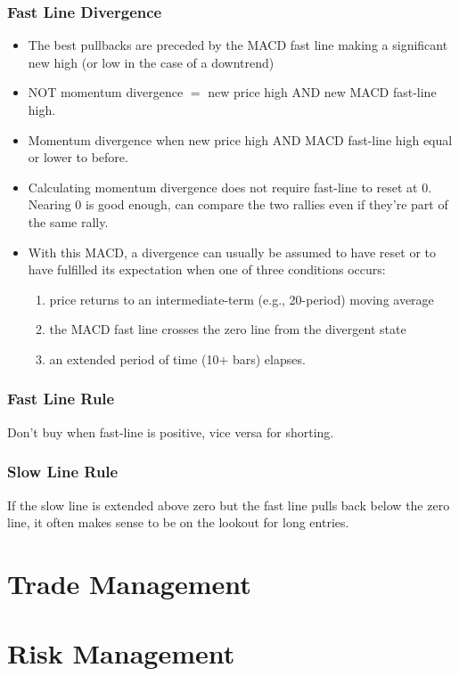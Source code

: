 \documentclass{../notes}
\begin{document}
\subsubsection{Fast Line Divergence}
\begin{itemize}
  \item The best pullbacks are preceded by the MACD fast line making a significant new high (or low in the case of a downtrend)
  \item NOT momentum divergence $=$ new price high AND new MACD fast-line high.
  \item Momentum divergence when new price high AND MACD fast-line high equal or lower to before.
  \item Calculating momentum divergence does not require fast-line to reset at 0. Nearing 0 is good enough, can compare the two rallies even if they're part of the same rally.
  \item With this MACD, a divergence can usually be assumed to have reset or to have fulfilled its expectation when one of three conditions occurs:
  \begin{enumerate}
    \item price returns to an intermediate-term (e.g., 20-period) moving average
    \item the MACD fast line crosses the zero line from the divergent state
    \item an extended period of time (10+ bars) elapses.
  \end{enumerate}
\end{itemize}

\subsubsection{Fast Line Rule}
Don't buy when fast-line is positive, vice versa for shorting.

\subsubsection{Slow Line Rule}
If the slow line is extended above zero but the fast line pulls back below the zero line, it often makes sense to be on the lookout for long entries.
\section{Trade Management}
\section{Risk Management}
\end{document}
